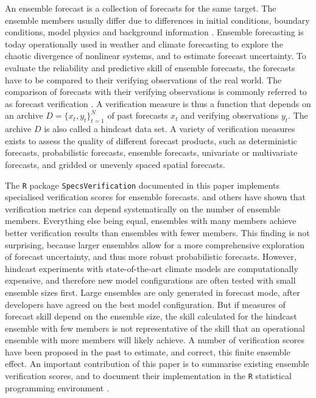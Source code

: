\documentclass[10pt]{article}\usepackage[]{graphicx}\usepackage[]{color}
\newcommand{\proglang}[1]{\texttt{#1}}
\newcommand{\pkg}[1]{\texttt{#1}}
\begin{document}
An ensemble forecast is a collection of forecasts for the same target.
The ensemble members usually differ due to differences in initial conditions, boundary conditions, model physics and background information \citep{gneiting2005atmospheric, leutbecher2008ensemble}.
Ensemble forecasting is today operationally used in weather and climate forecasting to explore the chaotic divergence of nonlinear systems, and to estimate forecast uncertainty.
To evaluate the reliability and predictive skill of ensemble forecasts, the forecasts have to be compared to their verifying observations of the real world.
%
The comparison of forecasts with their verifying observations is commonly referred to as forecast verification \citep{jolliffe2012forecast}.
A verification measure is thus a function that depends on an archive $D=\{x_t, y_t\}_{t=1}^N$ of past forecasts $x_t$ and verifying observations $y_t$.
The archive $D$ is also called a hindcast data set.
A variety of verification measures exists to assess the quality of different forecast products, such as deterministic forecasts, probabilistic forecasts, ensemble forecasts, univariate or multivariate forecasts, and gridded or unevenly spaced spatial forecasts.


The \proglang{R} package \pkg{SpecsVerification} documented in this paper implements specialised verification scores for ensemble forecasts.
\citet{buizza1998impact} and others have shown that verification metrics can depend systematically on the number of ensemble members. 
Everything else being equal, ensembles with many members achieve better verification results than ensembles with fewer members.
This finding is not surprising, because larger ensembles allow for a more comprehensive exploration of forecast uncertainty, and thus more robust probabilistic forecasts.
However, hindcast experiments with state-of-the-art climate models are computationally expensive, and therefore new model configurations are often tested with small ensemble sizes first.
Large ensembles are only generated in forecast mode, after developers have agreed on the best model configuration.
But if measures of forecast skill depend on the ensemble size, the skill calculated for the hindcast ensemble with few members is not representative of the skill that an operational ensemble with more members will likely achieve.
A number of verification scores have been proposed in the past to estimate, and correct, this finite ensemble effect.
An important contribution of this paper is to summarise existing ensemble verification scores, and to document their implementation in the \proglang{R} statistical programming environment \citep{R2015}.
\end{document}

